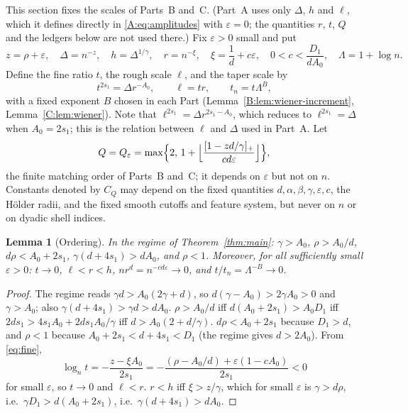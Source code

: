 \documentclass[11pt]{article}
\newtheorem{lemma}[lemma]{Lemma}
\begin{document}
This section fixes the scales of Parts~B and~C.  (Part~A uses only
\(\Delta\), \(h\) and \(\ell\), which it defines directly in
\eqref{A:eq:amplitudes} with \(\varepsilon=0\); the quantities \(r\), \(t\),
\(Q\) and the ledgers below are not used there.)  Fix \(\varepsilon>0\)
small and put
\begin{equation}
 z=\rho+\varepsilon,\quad \Delta=n^{-z},\quad h=\Delta^{1/\gamma},\quad
 r=n^{-\xi},\quad \xi=\frac1d+c\varepsilon,\quad 0<c<\frac{D_1}{dA_0},
 \quad \Lambda=1+\log n .
 \label{eq:scales}
\end{equation}
Define the fine ratio \(t\), the rough scale \(\ell\), and the taper scale
by
\begin{equation}
 t^{2s_1}=\Delta r^{-A_0},\qquad \ell=tr,\qquad t_n=t\Lambda^B,
 \label{eq:fine}
\end{equation}
with a fixed exponent \(B\) chosen in each Part (Lemma~\ref{B:lem:wiener-increment},
Lemma~\ref{C:lem:wiener}).  Note that \(\ell^{2s_1}=\Delta r^{2s_1-A_0}\),
which reduces to \(\ell^{2s_1}=\Delta\) when \(A_0=2s_1\); this is the
relation between \(\ell\) and \(\Delta\) used in Part~A.  Let
\begin{equation}
 Q=Q_\varepsilon=\max\Bigl\{2,\,1+\Bigl\lfloor\frac{[1-zd/\gamma]_+}{cd\varepsilon}\Bigr\rfloor\Bigr\},
 \label{eq:Q}
\end{equation}
the finite matching order of Parts~B and~C; it depends on \(\varepsilon\)
but not on \(n\).  Constants denoted by \(C_Q\) may depend on the fixed
quantities \(d,\alpha,\beta,\gamma,\varepsilon,c\), the Hölder radii, and
the fixed smooth cutoffs and feature system, but never on \(n\) or on
dyadic shell indices.

\begin{lemma}[Ordering]\label{lem:order}
In the regime of Theorem~\ref{thm:main}: \(\gamma>A_0\), \(\rho>A_0/d\),
\(d\rho<A_0+2s_1\), \(\gamma(d+4s_1)>dA_0\), and \(\rho<1\).  Moreover, for
all sufficiently small \(\varepsilon>0\): \(t\to0\), \(\ell<r<h\),
\(nr^d=n^{-cd\varepsilon}\to0\), and \(t/t_n=\Lambda^{-B}\to0\).
\end{lemma}

\begin{proof}
The regime reads \(\gamma d>A_0(2\gamma+d)\), so \(d(\gamma-A_0)>2\gamma
A_0>0\) and \(\gamma>A_0\); also \(\gamma(d+4s_1)>\gamma d>dA_0\).
\(\rho>A_0/d\) iff \(d(A_0+2s_1)>A_0D_1\) iff \(2ds_1>4s_1A_0+2ds_1A_0/\gamma\)
iff \(d>A_0(2+d/\gamma)\).  \(d\rho<A_0+2s_1\) because \(D_1>d\), and
\(\rho<1\) because \(A_0+2s_1<d+4s_1<D_1\) (the regime gives \(d>2A_0\)).
From \eqref{eq:fine},
\[
 \log_nt=-\frac{z-\xi A_0}{2s_1}
 =-\frac{(\rho-A_0/d)+\varepsilon(1-cA_0)}{2s_1}<0
\]
for small \(\varepsilon\), so \(t\to0\) and \(\ell<r\).  \(r<h\) iff
\(\xi>z/\gamma\), which for small \(\varepsilon\) is \(\gamma>d\rho\), i.e.\
\(\gamma D_1>d(A_0+2s_1)\), i.e.\ \(\gamma(d+4s_1)>dA_0\).
\end{proof}
\end{document}
